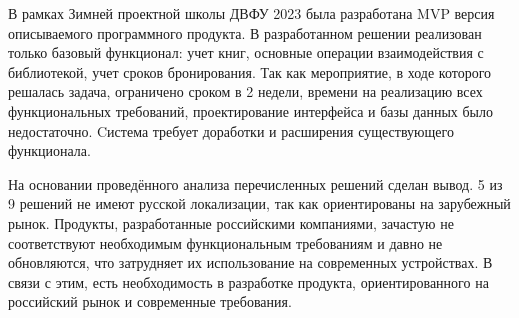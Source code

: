 \documentclass[./intro.tex]{subfiles}
\begin{document}
\par
В рамках Зимней проектной школы ДВФУ 2023 была разработана MVP версия описываемого программного продукта. В разработанном решении реализован только базовый функционал: учет книг, основные операции взаимодействия с библиотекой, учет сроков бронирования.
Так как мероприятие, в ходе которого решалась задача, ограничено сроком в 2 недели, времени на реализацию всех функциональных требований, проектирование интерфейса и базы данных было недостаточно. Cистема требует доработки и расширения существующего функционала.

\par На основании проведённого анализа перечисленных решений сделан вывод. 5 из 9 решений не имеют русской локализации, так как ориентированы на зарубежный рынок.
Продукты, разработанные российскими компаниями, зачастую не соответствуют необходимым функциональным требованиям и давно не обновляются, что затрудняет их использование на современных устройствах.
В связи с этим, есть необходимость в разработке продукта, ориентированного на российский рынок и современные требования.
\end{document}
